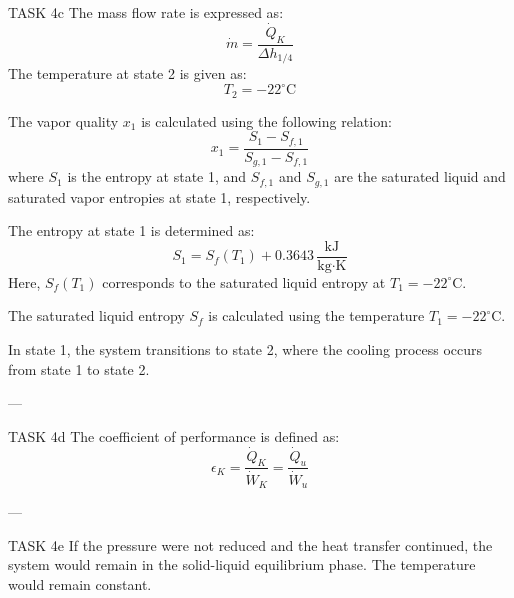 TASK 4c  
The mass flow rate is expressed as:  
\[
\dot{m} = \frac{\dot{Q}_K}{\Delta h_{1/4}}
\]  
The temperature at state 2 is given as:  
\[
T_2 = -22^\circ\text{C}
\]  

The vapor quality \( x_1 \) is calculated using the following relation:  
\[
x_1 = \frac{S_1 - S_{f,1}}{S_{g,1} - S_{f,1}}
\]  
where \( S_1 \) is the entropy at state 1, and \( S_{f,1} \) and \( S_{g,1} \) are the saturated liquid and saturated vapor entropies at state 1, respectively.  

The entropy at state 1 is determined as:  
\[
S_1 = S_f(T_1) + 0.3643 \, \frac{\text{kJ}}{\text{kg·K}}
\]  
Here, \( S_f(T_1) \) corresponds to the saturated liquid entropy at \( T_1 = -22^\circ\text{C} \).  

The saturated liquid entropy \( S_f \) is calculated using the temperature \( T_1 = -22^\circ\text{C} \).  

In state 1, the system transitions to state 2, where the cooling process occurs from state 1 to state 2.  

---

TASK 4d  
The coefficient of performance is defined as:  
\[
\epsilon_K = \frac{\dot{Q}_K}{\dot{W}_K} = \frac{\dot{Q}_u}{\dot{W}_u}
\]  

---

TASK 4e  
If the pressure were not reduced and the heat transfer continued, the system would remain in the solid-liquid equilibrium phase. The temperature would remain constant.